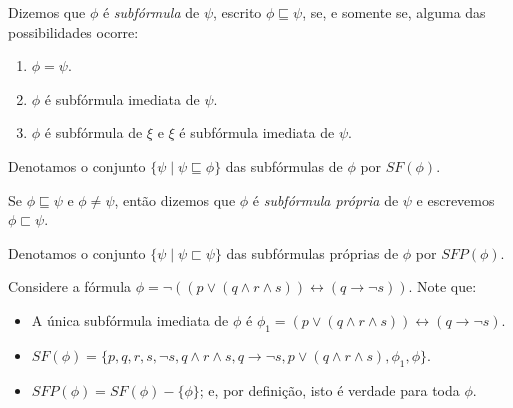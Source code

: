 \begin{definition}
	Dizemos que $\phi$ é \emph{subfórmula} de $\psi$, escrito $\phi \sqsubseteq \psi$, se, e somente se, alguma das possibilidades ocorre:
	\begin{enumerate}
		\item $\phi = \psi$.
		\item $\phi$ é subfórmula imediata de $\psi$.
		\item $\phi$ é subfórmula de $\xi$ e $\xi$ é subfórmula imediata de $\psi$.
	\end{enumerate}
	
	Denotamos o conjunto $\{\psi \mid \psi \sqsubseteq \phi \}$ das subfórmulas de $\phi$ por $SF(\phi)$.
	
	Se $\phi \sqsubseteq \psi$ e $\phi \neq \psi$, então dizemos que $\phi$ é \emph{subfórmula própria} de $\psi$ e escrevemos $\phi \sqsubset \psi$.
	
	Denotamos o conjunto $\{\psi \mid \psi \sqsubset \psi \}$ das subfórmulas próprias de $\phi$ por $SFP(\phi)$.
\end{definition}

\begin{example}
	Considere a fórmula $\phi = \neg((p \vee (q \wedge r \wedge s)) \leftrightarrow (q \rightarrow \neg s))$. Note que:
	\begin{itemize}
		\item A única subfórmula imediata de $\phi$ é $\phi_1 = (p \vee (q \wedge r \wedge s)) \leftrightarrow (q \rightarrow \neg s)$.
		\item $SF(\phi) = \{p,q,r,s,\neg s,q \wedge r \wedge s,q \rightarrow \neg s,p \vee (q \wedge r \wedge s),\phi_1,\phi \}$.
		\item $SFP(\phi) = SF(\phi) - \{\phi \}$; e, por definição, isto é verdade para toda $\phi$.
	\end{itemize}
\end{example}

